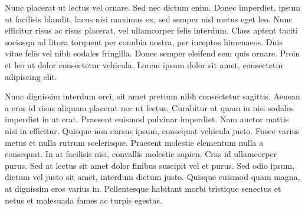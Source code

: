 Nunc placerat ut lectus vel ornare. Sed nec dictum enim. Donec
imperdiet, ipsum ut facilisis blandit, lacus nisi maximus ex, sed
semper nisl metus eget leo. Nunc efficitur risus ac risus placerat,
vel ullamcorper felis interdum. Class aptent taciti sociosqu ad litora
torquent per conubia nostra, per inceptos himenaeos. Duis vitae felis
vel nibh sodales fringilla. Donec semper eleifend sem quis
ornare. Proin et leo ut dolor consectetur vehicula. Lorem ipsum dolor
sit amet, consectetur adipiscing elit.

Nunc dignissim interdum orci, sit amet pretium nibh consectetur
sagittis. Aenean a eros id risus aliquam placerat nec ut
lectus. Curabitur at quam in nisi sodales imperdiet in at
erat. Praesent euismod pulvinar imperdiet. Nam auctor mattis nisi in
efficitur. Quisque non cursus ipsum, consequat vehicula justo. Fusce
varius metus et nulla rutrum scelerisque. Praesent molestie elementum
nulla a consequat. In at facilisis nisi, convallis molestie
sapien. Cras id ullamcorper purus. Sed at lectus sit amet dolor
finibus suscipit vel et purus. Sed odio ipsum, dictum vel justo sit
amet, interdum dictum justo. Quisque euismod quam magna, at dignissim
eros varius in. Pellentesque habitant morbi tristique senectus et
netus et malesuada fames ac turpis egestas.





